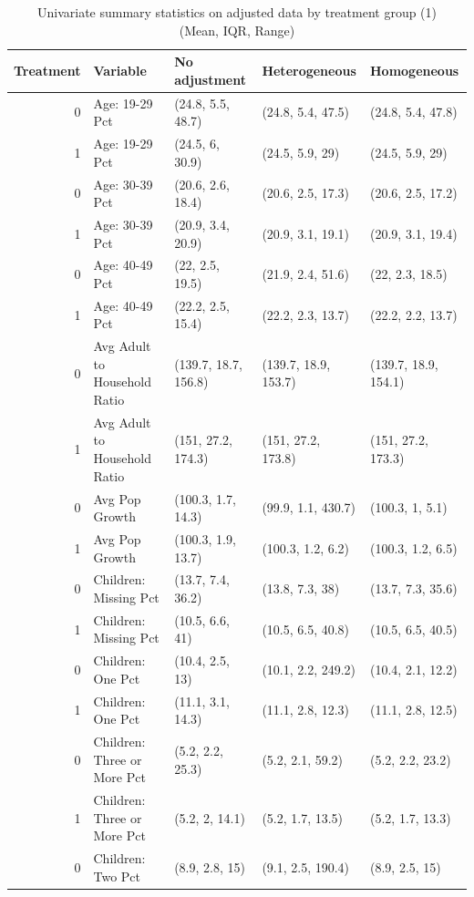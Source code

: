 \begin{table}[h!]
\centering
\caption{Univariate summary statistics on adjusted data by treatment group (1) \\ (Mean, IQR, Range)}\label{tab:summarytab1}
\begin{tabular}{rllll}
  \hline
Treatment & Variable & No adjustment & Heterogeneous & Homogeneous \\ 
  \hline
0 & Age: 19-29 Pct & (24.8, 5.5, 48.7) & (24.8, 5.4, 47.5) & (24.8, 5.4, 47.8) \\ 
  1 & Age: 19-29 Pct & (24.5, 6, 30.9) & (24.5, 5.9, 29) & (24.5, 5.9, 29) \\ 
  0 & Age: 30-39 Pct & (20.6, 2.6, 18.4) & (20.6, 2.5, 17.3) & (20.6, 2.5, 17.2) \\ 
  1 & Age: 30-39 Pct & (20.9, 3.4, 20.9) & (20.9, 3.1, 19.1) & (20.9, 3.1, 19.4) \\ 
  0 & Age: 40-49 Pct & (22, 2.5, 19.5) & (21.9, 2.4, 51.6) & (22, 2.3, 18.5) \\ 
  1 & Age: 40-49 Pct & (22.2, 2.5, 15.4) & (22.2, 2.3, 13.7) & (22.2, 2.2, 13.7) \\ 
  0 & Avg Adult to Household Ratio & (139.7, 18.7, 156.8) & (139.7, 18.9, 153.7) & (139.7, 18.9, 154.1) \\ 
  1 & Avg Adult to Household Ratio & (151, 27.2, 174.3) & (151, 27.2, 173.8) & (151, 27.2, 173.3) \\ 
  0 & Avg Pop Growth & (100.3, 1.7, 14.3) & (99.9, 1.1, 430.7) & (100.3, 1, 5.1) \\ 
  1 & Avg Pop Growth & (100.3, 1.9, 13.7) & (100.3, 1.2, 6.2) & (100.3, 1.2, 6.5) \\ 
  0 & Children: Missing Pct & (13.7, 7.4, 36.2) & (13.8, 7.3, 38) & (13.7, 7.3, 35.6) \\ 
  1 & Children: Missing Pct & (10.5, 6.6, 41) & (10.5, 6.5, 40.8) & (10.5, 6.5, 40.5) \\ 
  0 & Children: One Pct & (10.4, 2.5, 13) & (10.1, 2.2, 249.2) & (10.4, 2.1, 12.2) \\ 
  1 & Children: One Pct & (11.1, 3.1, 14.3) & (11.1, 2.8, 12.3) & (11.1, 2.8, 12.5) \\ 
  0 & Children: Three or More Pct & (5.2, 2.2, 25.3) & (5.2, 2.1, 59.2) & (5.2, 2.2, 23.2) \\ 
  1 & Children: Three or More Pct & (5.2, 2, 14.1) & (5.2, 1.7, 13.5) & (5.2, 1.7, 13.3) \\ 
  0 & Children: Two Pct & (8.9, 2.8, 15) & (9.1, 2.5, 190.4) & (8.9, 2.5, 15) \\ 

\end{tabular}
\end{table}
